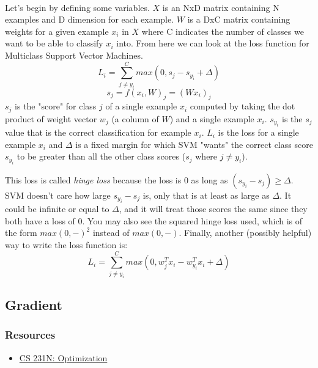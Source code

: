 \documentclass[12pt]{article}
\begin{document}
\paragraph{}
Let's begin by defining some variables. $X$ is an NxD matrix containing 
N examples and D dimension for each example. $W$ is a DxC matrix containing 
weights for a given example $x_i$ in $X$ where C indicates the number of 
classes we want to be able to classify $x_i$ into. From here we can look
at the loss function for Multiclass Support Vector Machines.
\begin{equation}
    L_{i} = \sum_{j \neq y_{i}}^C max(0, s_{j} - s_{y_{i}} + \Delta)
\end{equation}
\begin{equation}
    s_{j} = f(x_{i}, W)_{j} = (Wx_i)_j
\end{equation}
$s_j$ is the "score" for class $j$ of a single example $x_i$
computed by taking the dot product of weight vector $w_j$ 
(a column of $W$) and a single example $x_i$. $s_{y_{i}}$ is the $s_j$ value
that is the correct classification for example $x_i$. 
$L_i$ is the loss for a single example $x_i$ and $\Delta$ 
is a fixed margin for which SVM "wants" the correct class score 
$s_{y_i}$ to be greater than all the other class scores ($s_j$ where $j \neq y_i$). 

This loss is called \emph{hinge loss} because the loss is 0 as long as 
$(s_{y_i} - s_j) \geq \Delta$. SVM doesn't care how large $s_{y_i} - s_j$ is, 
only that is at least as large as $\Delta$. It could be infinite or equal to $\Delta$,
and it will treat those scores the same since they both have a loss of 0. You may 
also see the squared hinge loss used, which is of the form $max(0, -)^2$ instead 
of $max(0, -)$. Finally, another (possibly helpful) way to write the loss function is: 
\begin{equation}
    L_{i} = \sum_{j \neq y_{i}}^C max(0, w_{j}^T x_i - w_{y_i}^T x_i + \Delta)
\end{equation}


\subsection{Gradient}

\subsubsection*{Resources}
\begin{itemize}
    \item \href{https://cs231n.github.io/optimization-1/#gd}{CS 231N: Optimization}
\end{itemize}
\end{document}
